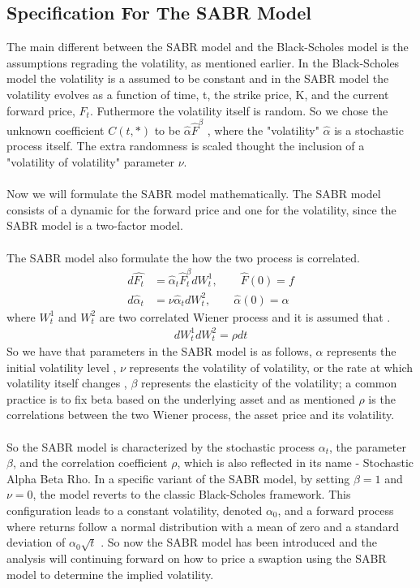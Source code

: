 \subsection{Specification For The SABR Model}
The main different between the SABR model and the 
Black-Scholes model is the assumptions regrading the 
volatility, as mentioned earlier. In the Black-Scholes 
model the volatility is a assumed to be constant and 
in the SABR model the volatility evolves as a function
of time, t, the strike price, K, and the current
forward price, $F_t$. Futhermore the volatility itself
is random. So we chose the unknown coefficient $C(t,*)$
to be $\hat{\alpha} \hat{F}^{\beta}$ \cite{Smile}, where the 
"volatility" $\hat{\alpha}$ is a stochastic process itself. 
The extra randomness is scaled thought the inclusion 
of a "volatility of volatility" parameter $\nu$.
\\\\
Now we will formulate the SABR model mathematically. 
The SABR model consists of a dynamic for the forward price
and one for the volatility, since the SABR model is a 
two-factor model. 
\\\\
The SABR model also formulate the 
how the two process is correlated. 
\begin{align}
    d \hat{F_t} &= 
    \hat{\alpha}_t \hat{F}_t^\beta dW_t^1, \quad \quad \hat{F}(0)=f   \label{f_dyn}\\
    d\hat{\alpha}_t &= \nu \hat{\alpha}_t dW_t^2, \quad \quad \hat{\alpha}(0)=\alpha \label{sigma_dyn}
\end{align}
where $W_t^{1}$ and $W_t^{2}$ are two correlated Wiener 
process and it is assumed that \cite{Smile}.
\begin{align}
    dW_t^{1}dW_t^{2}=\rho dt
\end{align}
So we have that 
parameters in the SABR model is as follows, $\alpha$ represents the initial volatility level
, $\nu$ represents the volatility of volatility, or the rate at which volatility itself changes
, $\beta$ represents the elasticity of the volatility; a common practice is to fix beta based on the underlying asset 
and as mentioned $\rho$ is the correlations between the 
two Wiener process, the asset price and its volatility. 
\\\\
So the SABR model is characterized by the stochastic process $\alpha_t$,
the parameter $\beta$, and the correlation coefficient $\rho$,
which is also reflected in its name - Stochastic Alpha Beta Rho.
In a specific variant of the SABR model, 
by setting $\beta = 1 $ and $\nu = 0$, the model reverts 
to the classic Black-Scholes framework. 
This configuration leads to a constant volatility, 
denoted $\alpha_0 $, 
and a forward process where returns follow a 
normal distribution with a mean of zero and a standard 
deviation of $\alpha_0 \sqrt{t}$ \cite{Smile}. So now the SABR model
has been introduced and the analysis will continuing forward 
on how to price a swaption using the SABR model to determine the implied
volatility.
